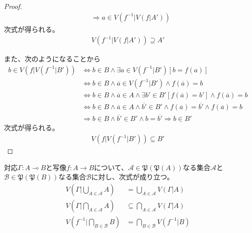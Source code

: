 \documentclass[a4paper]{jsarticle}
\begin{document}
\begin{proof}
\begin{align*}
&\Rightarrow a \in V\left( f^{- 1}|V\left( f|A' \right) \right)
\end{align*}
次式が得られる。
\begin{align*}
V\left( f^{- 1}|V\left( f|A' \right) \right) \supseteq A'
\end{align*}\par
また、次のようになることから
\begin{align*}
b \in V\left( f|V\left( f^{- 1}|B' \right) \right) &\Leftrightarrow b \in B \land \exists a \in V\left( f^{- 1}|B' \right)\left[ b = f(a) \right]\\
&\Leftrightarrow b \in B \land \overline{a} \in V\left( f^{- 1}|B' \right) \land f\left( \overline{a} \right) = b\\
&\Leftrightarrow b \in B \land \overline{a} \in A \land \exists b' \in B'\left[ f\left( \overline{a} \right) = b' \right] \land f\left( \overline{a} \right) = b\\
&\Leftrightarrow b \in B \land \overline{a} \in A \land \overline{b'} \in B' \land f\left( \overline{a} \right) = \overline{b'} \land f\left( \overline{a} \right) = b\\
&\Rightarrow b \in B \land \overline{b'} \in B' \land b = \overline{b'} \Rightarrow b \in B'
\end{align*}
次式が得られる。
\begin{align*}
V\left( f|V\left( f^{- 1}|B' \right) \right) \subseteq B'
\end{align*}
\end{proof}
\begin{thm}
\label{1.2.2.9}
対応$\varGamma:A \multimap B$と写像$f:A \rightarrow B$について、$\mathcal{A \in}\mathfrak{P}\left( \mathfrak{P}(A) \right)$なる集合$\mathcal{A}$と$\mathcal{B \in}\mathfrak{P}\left( \mathfrak{P}(B) \right)$なる集合$\mathcal{B}$に対し、次式が成り立つ。
\begin{align*}
V\left( \varGamma|\bigcup_{A \in \mathcal{A}} A \right) &= \bigcup_{A \in \mathcal{A}} {V\left( \varGamma|A \right)}\\
V\left( \varGamma|\bigcap_{A \in \mathcal{A}} A \right) &\subseteq \bigcap_{A \in \mathcal{A}} {V\left( \varGamma|A \right)}\\
V\left( f^{- 1}|\bigcap_{B\in \mathcal{B}} B \right) &= \bigcap_{B\in \mathcal{B}} {V\left( f^{- 1}|B \right)}
\end{align*}
\end{thm}
\end{document}
